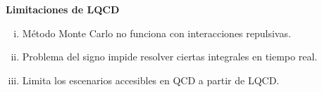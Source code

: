 \documentclass{beamer}
\begin{document}
\begin{frame}[standout]
  \Large\textbf{Limitaciones de LQCD}
  \vspace{1em}

  \begin{enumerate}[i.]
    \item Método Monte Carlo no funciona con interacciones repulsivas.
    \item Problema del signo impide resolver ciertas integrales en tiempo real.
    \item Limita los escenarios accesibles en QCD a partir de LQCD.
  \end{enumerate}
\end{frame}


\end{document}
